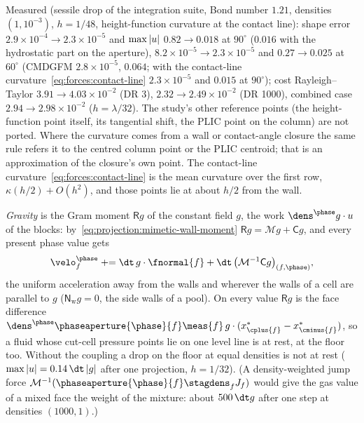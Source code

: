 Measured (sessile drop of the integration suite, Bond number $1.21$, densities
$(1,10^{-3})$, $h=1/48$, height-function curvature at the contact line): shape error $2.9\times10^{-4}\to2.3\times10^{-5}$ and
$\max\left\lvert u \right\rvert$ $0.82\to0.018$ at $90^\circ$ ($0.016$ with the hydrostatic part on
the aperture), $8.2\times10^{-5}\to2.3\times10^{-5}$ and
$0.27\to0.025$ at $60^\circ$ (CMDGFM $2.8\times10^{-5}$, $0.064$; with the
contact-line curvature~\cref{eq:forces:contact-line} $2.3\times10^{-5}$
and $0.015$ at $90^\circ$); cost
Rayleigh--Taylor $3.91\to4.03\times10^{-2}$ (DR 3), $2.32\to2.49\times10^{-2}$
(DR 1000), combined case $2.94\to2.98\times10^{-2}$ ($h=\lambda/32$). The study's
other reference points (the height-function point itself, its tangential
shift, the PLIC point on the column) are not ported. Where the curvature comes
from a wall or contact-angle closure the same rule refers it to the centred
column point or the PLIC centroid; that is an approximation of the closure's
own point. The contact-line curvature~\cref{eq:forces:contact-line} is
the mean curvature over the first row, $\kappa(h/2)+O(h^2)$, and those points
lie at about $h/2$ from the wall.

\emph{Gravity} is the Gram moment $\mathsf R g$ of the constant field $g$, the
work $\dens^{\phase}g\cdot u$ of the blocks: by~\cref{eq:projection:mimetic-wall-moment}
$\mathsf Rg=\mathcal Mg+\mathsf Cg$, and every present phase value gets
\begin{equation}\label{eq:projection:mimetic-gravity}
  \velo^{\phase}_f\mathrel{+}=\dt\,g\cdot\fnormal{f}+\dt\,\bigl(\mathcal M^{-1}\mathsf Cg\bigr)_{(f,\phase)} ,
\end{equation}
the uniform acceleration away from the walls and wherever the walls of a cell
are parallel to $g$ ($\mathsf N_{\mathrm w}g=0$, the side walls of a pool). On
every value $\mathsf Rg$ is the face difference
$\dens^{\phase}\phaseaperture{\phase}{f}\meas{f}\,g\cdot(x^{*}_{\cplus{f}}-x^{*}_{\cminus{f}})$,
so a fluid whose cut-cell pressure points lie on one level line is at rest,
at the floor too. Without the coupling a drop on the floor at equal
densities is not at rest ($\max\abs{u}=0.14\,\dt\abs{g}$ after one projection, $h=1/32$). (A density-weighted jump force $\mathcal M^{-1}(\phaseaperture{\phase}{f}\stagdens_fJ_f)$
would give the gas value of a mixed face the weight of the mixture: about
$500\,\dt g$ after one step at densities $(1000,1)$.)

